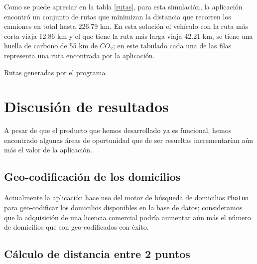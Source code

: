 \documentclass[journal]{IEEEtran}
\begin{document}
            Como se puede apreciar en la tabla \ref{rutas}, para esta simulación, la aplicación encontró un conjunto de rutas que minimizan la distancia que recorren los camiones en total hasta 226.79 km. En esta solución el vehículo con la ruta más corta viaja 12.86 km y el que tiene la ruta más larga viaja 42.21 km, se tiene una huella de carbono de 55 km de $CO_2$; en este tabulado cada una de las filas representa una ruta encontrada por la aplicación.
            
            \begin{table}[h!]
                \centering
                \caption{Rutas generadas por el programa}
                \label{rutas}
            \end{table}
            
    \section{Discusión de resultados} \label{sec:discusion}
        
        A pesar de que el producto que hemos desarrollado ya es funcional, hemos encontrado algunas áreas de oportunidad que de ser resueltas incrementarían aún más el valor de la aplicación.
        
        \subsection{Geo-codificación de los domicilios}
            
            Actualmente la aplicación hace uso del motor de búsqueda de domicilios \texttt{Photon} \cite{photon} para geo-codificar los domicilios disponibles en la base de datos; consideramos que la adquisición de una licencia comercial podría aumentar aún más el número de domicilios que son geo-codificados con éxito.
            
        \subsection{Cálculo de distancia entre 2 puntos}
            
\end{document}

